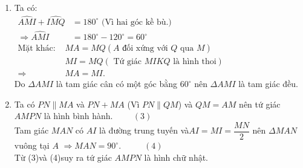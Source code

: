 \begin{ex}
{\begin{enumerate}
		Từ (1) và (2) suy ra tứ giác $MIKQ$ là hình thoi.
		\item Ta có:\\$\begin{aligned}\widehat{AMI}+\widehat{IMQ}&=180^\circ\mbox{ (Vì hai góc kề bù.)}\\
	    \Rightarrow \widehat{AMI}&=180^\circ-120^\circ=60^\circ\end{aligned}$\\
		$\begin{aligned}\text{Mặt khác: }&MA=MQ\left(A\text{ đối xứng với }Q\text{ qua }M\right)\\
		&MI=MQ\left(\mbox{ Tứ giác }MIKQ\mbox{ là hình thoi}\right)\\
		\Rightarrow &MA=MI.\end{aligned}$\\
		Do $\Delta AMI$ là tam giác cân có một góc bằng $60^\circ$ nên $\Delta AMI$ là tam giác đều.
		\item Ta có $PN\parallel MA$ và $PN+MA$ (Vì $PN\parallel QM$) và $QM=AM$  nên tứ giác $AMPN$ là hình bình hành.$\hspace{1cm}\left(3\right)$\\
			Tam giác $MAN$ có $AI$  là đường trung tuyến và$AI=MI=\dfrac{MN}{2}$ nên $\Delta MAN$ vuông tại $A$ $\Rightarrow\widehat{MAN}=90^\circ$. $\hspace{1cm}\left(4\right)$\\
			Từ (3)và (4)suy ra tứ giác $AMPN$ là hình chữ nhật.\\	
	\end{enumerate}
}
\end{ex}
